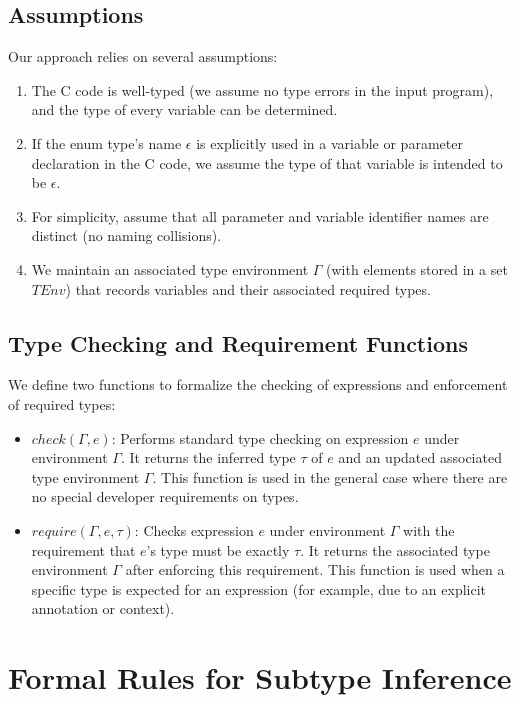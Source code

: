 \documentclass[10pt,conference]{IEEEtran}
\begin{document}
\subsection{Assumptions}
Our approach relies on several assumptions:
\begin{enumerate}
    \item The C code is well-typed (we assume no type errors in the input program), and the type of every variable can be determined.
    \item If the enum type's name $\epsilon$ is explicitly used in a variable or parameter declaration in the C code, we assume the type of that variable is intended to be $\epsilon$.
    \item For simplicity, assume that all parameter and variable identifier names are distinct (no naming collisions).
    \item We maintain an associated type environment $\Gamma$ (with elements stored in a set $TEnv$) that records variables and their associated required types.
\end{enumerate}

\subsection{Type Checking and Requirement Functions}
We define two functions to formalize the checking of expressions and enforcement of required types:
\begin{itemize}
    \item $check(\Gamma, e)$: Performs standard type checking on expression $e$ under environment $\Gamma$. It returns the inferred type $\tau$ of $e$ and an updated associated type environment $\Gamma$. This function is used in the general case where there are no special developer requirements on types.
    \item $require(\Gamma, e, \tau)$: Checks expression $e$ under environment $\Gamma$ with the requirement that $e$'s type must be exactly $\tau$. It returns the associated type environment $\Gamma$ after enforcing this requirement. This function is used when a specific type is expected for an expression (for example, due to an explicit annotation or context).
\end{itemize}

\section{Formal Rules for Subtype Inference}
\end{document}
